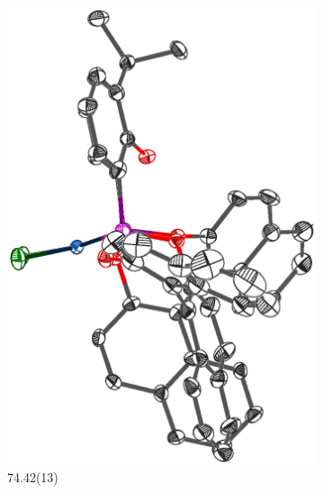 \begin{figure}[htbp]
\begin{subfigure}[b]{0.25\textwidth}
                \includegraphics[width=\textwidth]{../Othercrystals/PtCl2/295949side.eps}
                \caption{74.42(13)\degrees{}\cite{Duren2006}}
                \label{PtCl2BINAPside}
        \end{subfigure}
        ~
        \begin{subfigure}[b]{0.3\textwidth}

\end{subfigure}
\end{figure}
